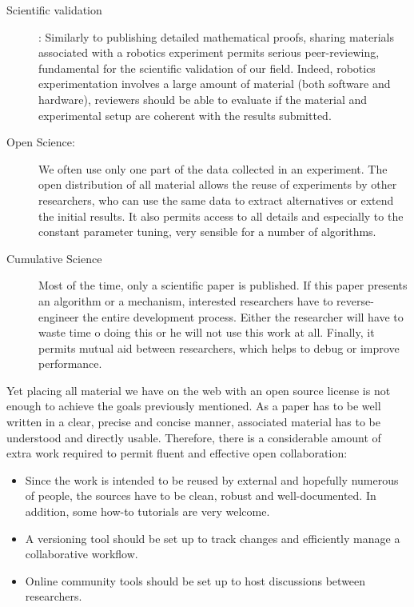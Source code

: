 \begin{description}
    \item[Scientific validation]: Similarly to publishing detailed mathematical proofs, sharing materials associated with a robotics experiment permits serious peer-reviewing, fundamental for the scientific validation of our field.
    Indeed, robotics experimentation involves a large amount of material (both software and hardware), reviewers should be able to evaluate if the material and experimental setup are coherent with the results submitted.

    \item[Open Science:] We often use only one part of the data collected in an experiment. The open distribution of all material allows the reuse of experiments by other researchers, who can use the same data to extract alternatives or extend the initial results.
    It also permits access to all details and especially to the constant parameter tuning, very sensible for a number of algorithms.

    \item[Cumulative Science] Most of the time, only a scientific paper is published. If this paper presents an algorithm or a mechanism, interested researchers have to reverse-engineer the entire development process. Either the researcher will have to waste time o doing this or he will not use this work at all.
    Finally, it permits mutual aid between researchers, which helps to debug or improve performance.

\end{description}


Yet placing all material we have on the web with an open source license is not enough to achieve the goals previously mentioned. As a paper has to be well written in a clear, precise and concise manner, associated material has to be understood and directly usable.
Therefore, there is a considerable amount of extra work required to permit fluent and effective open collaboration:
\begin{itemize}
    \item Since the work is intended to be reused by external and hopefully numerous of people, the sources have to be clean, robust and well-documented. In addition, some how-to tutorials are very welcome.
    \item A versioning tool should be set up to track changes and efficiently manage a collaborative workflow.
    \item Online community tools should be set up to host discussions between researchers.
\end{itemize}

